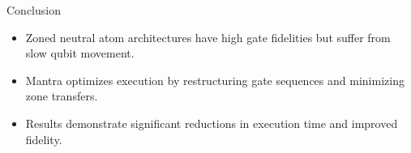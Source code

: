 \documentclass{beamer}
\begin{document}
	
	\begin{frame}{Conclusion}
		\begin{itemize}
			\item Zoned neutral atom architectures have high gate fidelities but suffer from slow qubit movement.
			\item Mantra optimizes execution by restructuring gate sequences and minimizing zone transfers.
			\item Results demonstrate significant reductions in execution time and improved fidelity.
		\end{itemize}
	\end{frame}
	
\end{document}
